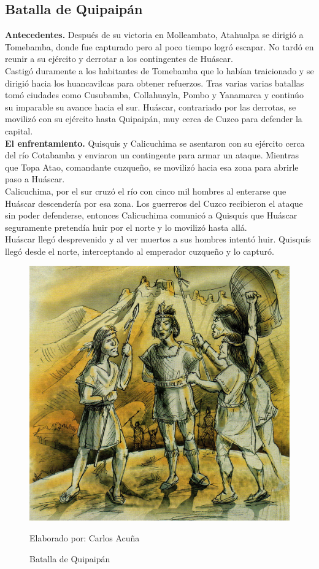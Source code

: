 \documentclass[a4paper, openright, 12pt]{report}
\begin{document}
\subsection*{Batalla de Quipaipán}
\justify
\textbf{Antecedentes.} Después de su victoria en Molleambato, Atahualpa se dirigió a Tomebamba, donde fue capturado pero al poco tiempo logró escapar. No tardó en reunir a su ejército y derrotar a los contingentes de Huáscar.\\
Castigó duramente a los habitantes de Tomebamba que lo habían traicionado y se dirigió hacia los huancavilcas para obtener refuerzos. Tras varias varias batallas tomó ciudades como Cusubamba, Collahuayla, Pombo y Yanamarca y continúo su imparable su avance hacia el sur. Huáscar, contrariado por las derrotas, se movilizó con su ejército hasta Quipaipán, muy cerca de Cuzco para defender la capital.\cite{2010batallas} \\ 
\textbf{El enfrentamiento.} Quisquis y Calicuchima se asentaron con su ejército cerca del río Cotabamba y enviaron un contingente para armar un ataque. Mientras que Topa Atao, comandante cuzqueño, se movilizó hacia esa zona para abrirle paso a Huáscar.\\
Calicuchima, por el sur cruzó el río con cinco mil hombres al enterarse que Huáscar descendería por esa zona. Los guerreros del Cuzco recibieron el ataque sin poder defenderse, entonces Calicuchima comunicó a Quisquís que Huáscar seguramente pretendía huir por el norte y lo movilizó hasta allá.\\
Huáscar llegó desprevenido y al ver muertos a sus hombres intentó huir. Quisquís llegó desde el norte, interceptando al emperador cuzqueño y lo capturó. \cite{2010batallas}

\begin{figure}[h]
\captionsetup{justification=centering,margin=2cm}
\includegraphics[scale=0.7]{h10}
\centering
\caption{Batalla de Quipaipán}
Elaborado por: Carlos Acuña
\label{fig:h10}
\end{figure}
\end{document}
